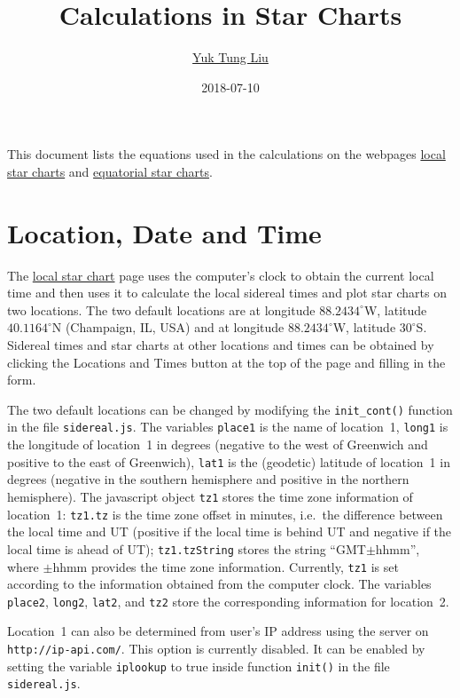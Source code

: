 \documentclass[12pt]{article}
\begin{document}
\title{Calculations in Star Charts}
\author{\href{https://publish.illinois.edu/ytliu/}{Yuk Tung Liu}}
\date{2018-07-10}
\maketitle

This document lists the equations used in the calculations 
on the webpages \href{../sidereal.html}{local star charts} and 
\href{../chartGCRS.html}{equatorial star charts}. 

\section{Location, Date and Time}

The \href{../sidereal.html}{local star chart} page uses the computer's 
clock to obtain the current local time and then uses it to calculate 
the local sidereal times and plot star charts on two locations. 
The two default locations are at longitude $88.2434^\circ$W, 
latitude $40.1164^\circ$N (Champaign, IL, USA) and at longitude $88.2434^\circ$W, 
latitude $30^\circ$S. Sidereal times and star charts at other locations 
and times can be obtained by clicking the Locations and Times button 
at the top of the page and filling in the form. 

The two default locations can be changed by modifying the {\tt init\_cont()} 
function in the file {\tt sidereal.js}. The variables {\tt place1} 
is the name of location~1, {\tt long1} is the longitude of location~1 
in degrees (negative to the west of Greenwich and positive to the east 
of Greenwich), {\tt lat1} is the (geodetic) latitude of location~1 in 
degrees (negative in the southern hemisphere and positive in the northern 
hemisphere). The javascript object {\tt tz1} stores the time zone information 
of location~1: {\tt tz1.tz} is the time zone offset in minutes, i.e.\ the difference 
between the local time and UT (positive if the local time is behind UT and 
negative if the local time is ahead of UT); {\tt tz1.tzString} stores the 
string ``GMT$\pm$hhmm'', where $\pm$hhmm provides the time zone information. 
Currently, {\tt tz1} is set according to the information obtained from the computer clock. 
The variables {\tt place2}, {\tt long2}, {\tt lat2}, and {\tt tz2} 
store the corresponding information for location~2. 

Location~1 can also be determined from user's IP address using the server 
on {\tt http://ip-api.com/}. This option is currently disabled. It can be 
enabled by setting the variable {\tt iplookup} to true inside function {\tt init()} 
in the file {\tt sidereal.js}.
\end{document}
